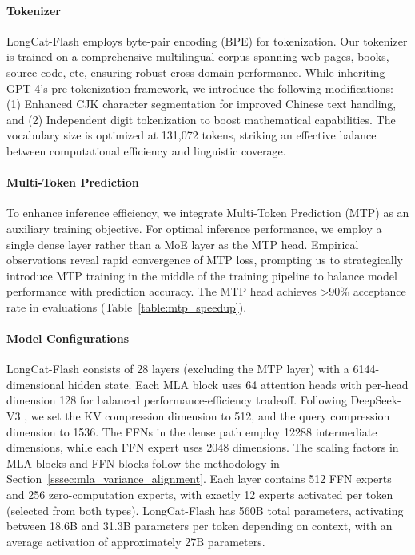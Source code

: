 \documentclass{article}
\newcommand{\longcat}{LongCat-Flash\xspace}
\begin{document}
\paragraph{Tokenizer} \longcat employs byte-pair encoding (BPE) \citep{shibata1999bpe,sennrich2015neural} for tokenization. Our tokenizer is trained on a comprehensive multilingual corpus spanning web pages, books, source code, etc, ensuring robust cross-domain performance. While inheriting GPT-4's pre-tokenization framework, we introduce the following modifications: (1) Enhanced CJK character segmentation for improved Chinese text handling, and (2) Independent digit tokenization to boost mathematical capabilities. The vocabulary size is optimized at 131,072 tokens, striking an effective balance between computational efficiency and linguistic coverage.

\paragraph{Multi-Token Prediction} To enhance inference efficiency, we integrate Multi-Token Prediction (MTP) \citep{gloeckle2024better,deepseekai2025deepseekv3technicalreport} as an auxiliary training objective. For optimal inference performance, we employ a single dense layer rather than a MoE layer as the MTP head. Empirical observations reveal rapid convergence of MTP loss, prompting us to strategically introduce MTP training in the middle of the training pipeline to balance model performance with prediction accuracy. The MTP head achieves >90\% acceptance rate in evaluations (Table~\ref{table:mtp_speedup}). 

\paragraph{Model Configurations} \longcat consists of 28 layers (excluding the MTP layer) with a 6144-dimensional hidden state. Each MLA block uses 64 attention heads with per-head dimension 128 for balanced performance-efficiency tradeoff. Following DeepSeek-V3 \citep{liu2024deepseek}, we set the KV compression dimension to 512, and the query compression dimension to 1536. The FFNs in the dense path employ 12288 intermediate dimensions, while each FFN expert uses 2048 dimensions. The scaling factors in MLA blocks and FFN blocks follow the methodology in Section~\ref{sssec:mla_variance_alignment}. Each layer contains 512 FFN experts and 256 zero-computation experts,  with exactly 12 experts activated per token (selected from both types). \longcat has 560B total parameters, activating between 18.6B and 31.3B parameters per token depending on context, with an average activation of approximately 27B parameters.
\end{document}
